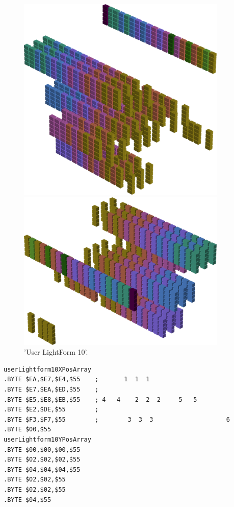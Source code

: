 \begin{minipage}[b]{0.48\linewidth}
\begin{figure}[H]
    \centering
    \begin{adjustbox}{width=4cm,margin=0cm 0cm}
      \includegraphics[width=10cm]{src/colorspace_patterns/pattern18-45.png}%
    \end{adjustbox}
    \begin{adjustbox}{width=4cm,margin=0cm 0cm}
      \includegraphics[width=10cm]{src/colorspace_patterns/pattern18-225.png}%
    \end{adjustbox}
\caption{'User LightForm 10'.}
\end{figure}
\end{minipage}
\begin{minipage}[b]{0.58\linewidth}
\begin{lrbox}{\mybox}%
\begin{lstlisting}[basicstyle=\ttfamily\tiny,escapechar=\%]
userLightform10XPosArray
.BYTE $EA,$E7,$E4,$55    ;       1  1  1                      
.BYTE $E7,$EA,$ED,$55    ;                                    
.BYTE $E5,$E8,$EB,$55    ; 4   4    2  2  2     5   5         
.BYTE $E2,$DE,$55        ;                                    
.BYTE $F3,$F7,$55        ;        3  3  3                    6
.BYTE $00,$55
userLightform10YPosArray
.BYTE $00,$00,$00,$55
.BYTE $02,$02,$02,$55
.BYTE $04,$04,$04,$55
.BYTE $02,$02,$55
.BYTE $02,$02,$55
.BYTE $04,$55
\end{lstlisting}
\end{lrbox}%
\scalebox{0.8}{\usebox{\mybox}}

\end{minipage}

